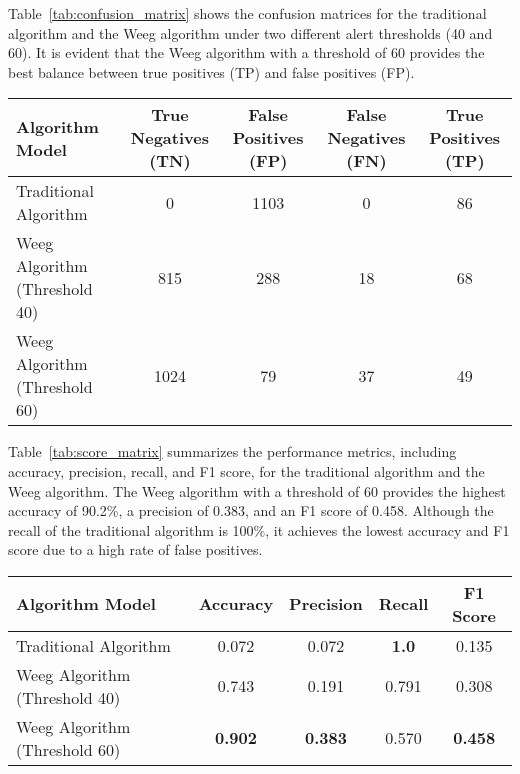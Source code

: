 \documentclass[10pt, sigconf]{acmart}
\begin{document}
Table~\ref{tab:confusion_matrix} shows the confusion matrices for the traditional algorithm and the Weeg algorithm under two different alert thresholds (40 and 60). It is evident that the Weeg algorithm with a threshold of 60 provides the best balance between true positives (TP) and false positives (FP).

\begin{table*}[htbp]  %
  \centering
  \caption{Confusion Matrix for Different Algorithms on the Test Dataset}
  \label{tab:confusion_matrix}
  \begin{tabular}{lcccc}
    \toprule
    Algorithm Model            & True Negatives (TN) & False Positives (FP) & False Negatives (FN) & True Positives (TP) \\
    \midrule
    Traditional Algorithm      & 0                   & 1103                 & 0                    & 86                  \\
    Weeg Algorithm (Threshold 40) & 815                 & 288                  & 18                   & 68                  \\
    Weeg Algorithm (Threshold 60) & 1024                & 79                   & 37                   & 49                  \\
    \bottomrule
  \end{tabular}
\end{table*}

Table~\ref{tab:score_matrix} summarizes the performance metrics, including accuracy, precision, recall, and F1 score, for the traditional algorithm and the Weeg algorithm. The Weeg algorithm with a threshold of 60 provides the highest accuracy of 90.2\%, a precision of 0.383, and an F1 score of 0.458. Although the recall of the traditional algorithm is 100\%, it achieves the lowest accuracy and F1 score due to a high rate of false positives.

\begin{table*}[htbp]
  \centering
  \caption{Performance Metrics for Different Algorithms on the Test Dataset (January-April 2024). Higher values are better for all metrics except False Positives (FP).}
  \label{tab:score_matrix}
  \begin{tabular}{lcccc}
    \toprule
    Algorithm Model            & Accuracy & Precision & Recall & F1 Score \\
    \midrule
    Traditional Algorithm      & 0.072    & 0.072     & \textbf{1.0}    & 0.135    \\
    Weeg Algorithm (Threshold 40) & 0.743    & 0.191     & 0.791   & 0.308    \\
    Weeg Algorithm (Threshold 60) & \textbf{0.902} & \textbf{0.383} & 0.570   & \textbf{0.458} \\
    \bottomrule
  \end{tabular}
\end{table*}
\end{document}
